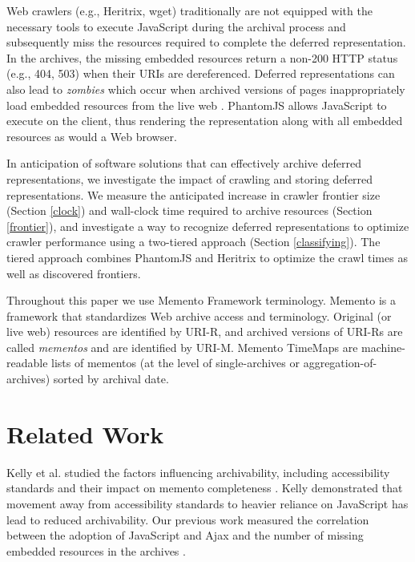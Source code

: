 \documentclass{sig-alternate}
\begin{document}
Web crawlers (e.g., Heritrix, wget) traditionally are not equipped with the necessary tools to execute JavaScript during the archival process \cite{googleJS} and subsequently miss the resources required to complete the deferred representation. In the archives, the missing embedded resources return a non-200 HTTP status (e.g., 404, 503) when their URIs are dereferenced. Deferred representations can also lead to \emph{zombies} which occur when archived versions of pages inappropriately load embedded resources from the live web \cite{zombies}. %
PhantomJS allows JavaScript to execute on the client, thus rendering the representation along with all embedded resources as would a Web browser.

In anticipation of software solutions that can effectively archive deferred representations, we investigate the impact of crawling and storing deferred representations. We measure the anticipated increase in crawler frontier size (Section \ref{clock}) and wall-clock time required to archive resources (Section \ref{frontier}), and investigate a way to recognize deferred representations to optimize crawler performance using a two-tiered approach (Section \ref{classifying}). The tiered approach combines PhantomJS and Heritrix to optimize the crawl times as well as discovered frontiers.

Throughout this paper we use Memento Framework terminology. Memento \cite{nelson:memento:tr} is a framework that standardizes Web archive access and terminology. Original (or live web) resources are identified by URI-R, and archived versions of URI-Rs are called \emph{mementos} and are identified by URI-M. Memento TimeMaps are machine-readable lists of mementos (at the level of single-archives or aggregation-of-archives) sorted by archival date.

\section{Related Work}
\label{priorwork}
Kelly et al. studied the factors influencing archivability, including accessibility standards and their impact on memento completeness \cite{kellyTPDL2013}. Kelly demonstrated that movement away from accessibility standards to heavier reliance on JavaScript has lead to reduced archivability. Our previous work measured the correlation between the adoption of JavaScript and Ajax and the number of missing embedded resources in the archives \cite{ijdl}.
\end{document}
